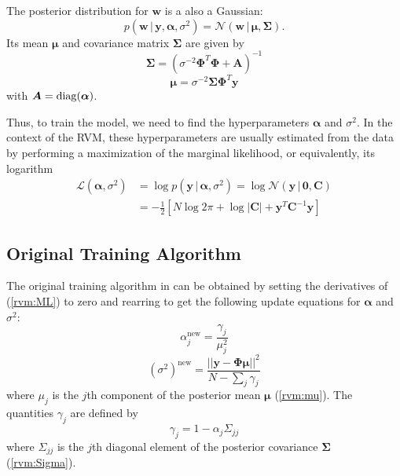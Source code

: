The posterior distribution for $\bm w$ is a also a Gaussian:
\begin{equation}
  \label{rvm:posterior}
  p(\bm w\,|\,\bm y,\bm\alpha,\sigma^2) = \mathcal{N}(\bm w\,|\,\bm\mu,\bm\Sigma).
\end{equation}
Its mean $\bm \mu$ and covariance matrix $\bm\Sigma$ are given by
\begin{equation}
  \label{rvm:Sigma}
  \bm\Sigma = \left(\sigma^{-2}\bm\Phi^T\bm\Phi + \bm A\right)^{-1}
\end{equation}
\begin{equation}
  \label{rvm:mu}
  \bm\mu = \sigma^{-2}\bm\Sigma\bm\Phi^T\bm y
\end{equation}
with $\bm A = \operatorname*{diag}(\bm\alpha)$.

Thus, to train the model, we need to find the hyperparameters $\bm \alpha$ and $\sigma^2$.
In the context of the RVM, these hyperparameters are usually estimated from the data by performing a maximization of the marginal likelihood, or equivalently, its logarithm
\begin{equation}
  \label{rvm:ML}
  \begin{split}
    \mathcal{L}(\bm\alpha,\sigma^2) &= \log p(\bm y\,|\,\bm\alpha,\sigma^2) = \log \mathcal{N}(\bm y \,|\,\bm 0, \bm C)\\
    &=-\frac{1}{2}\left[N\log 2\pi + \log|\bm C| + \bm y^T\bm C^{-1} \bm y\right]
\end{split}    
\end{equation}

\subsection{Original Training Algorithm}
\label{sect:rvm_orig}
The original training algorithm in \cite{tipping2001} can be obtained by setting the derivatives of (\ref{rvm:ML}) to zero and rearring to get the following update equations for $\bm\alpha$ and $\sigma^2$:
\begin{equation}
  \label{rvm:alpha}
  \alpha_j^{\mbox{new}} = \frac{\gamma_j}{\mu_j^2}
\end{equation}
\begin{equation}
  \label{rvm:beta}
  (\sigma^2)^{\mbox{new}} = \frac{||\bm y - \bm\Phi\bm\mu||^2}{N - \sum_j\gamma_j}
\end{equation}
where $\mu_j$ is the $j$th component of the posterior mean $\bm\mu$ (\ref{rvm:mu}).
The quantities $\gamma_j$ are defined by 
\begin{equation*}
  \gamma_j = 1 - \alpha_j \Sigma_{jj}
\end{equation*}
where $\Sigma_{jj}$ is the $j$th diagonal element of the posterior covariance $\bm\Sigma$ (\ref{rvm:Sigma}).

